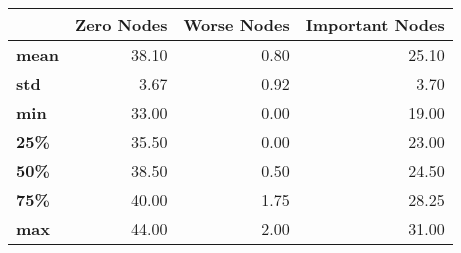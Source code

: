 \begin{tabular}{lrrr}
\toprule
{} &  Zero Nodes &  Worse Nodes &  Important Nodes \\
\midrule
\textbf{mean} &       38.10 &         0.80 &            25.10 \\
\textbf{std } &        3.67 &         0.92 &             3.70 \\
\textbf{min } &       33.00 &         0.00 &            19.00 \\
\textbf{25\% } &       35.50 &         0.00 &            23.00 \\
\textbf{50\% } &       38.50 &         0.50 &            24.50 \\
\textbf{75\% } &       40.00 &         1.75 &            28.25 \\
\textbf{max } &       44.00 &         2.00 &            31.00 \\
\bottomrule
\end{tabular}

